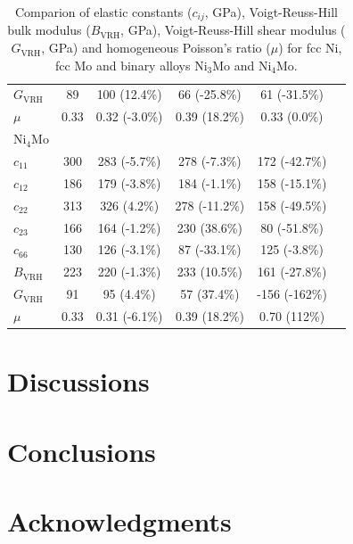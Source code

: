 \documentclass[prb,reprint]{revtex4-2}
\begin{document}
\begin{table}[h]
\begin{tabular}{lccccc}
$G_{\mathrm{VRH}}$ & 89 & 100 (12.4\%) & 66 (-25.8\%) & 61 (-31.5\%) & \\
$\mu$ & 0.33 & 0.32 (-3.0\%) & 0.39 (18.2\%) & 0.33 (0.0\%) & \\
\hline
Ni$_4$Mo \\
$c_{11}$ & 300 & 283 (-5.7\%) & 278 (-7.3\%) & 172 (-42.7\%) & \\
$c_{12}$ & 186 & 179 (-3.8\%) & 184 (-1.1\%) & 158 (-15.1\%) & \\
$c_{22}$ & 313 & 326 (4.2\%) & 278 (-11.2\%) & 158 (-49.5\%) & \\
\color{blue} $c_{23}$ & 166 & 164 (-1.2\%) & 230 (38.6\%) & 80 (-51.8\%) & \\
\color{blue} $c_{66}$ & 130 & 126 (-3.1\%) & 87 (-33.1\%) & 125 (-3.8\%) & \\
$B_{\mathrm{VRH}}$ & 223 & 220 (-1.3\%) & 233 (10.5\%) & 161 (-27.8\%) & \\
$G_{\mathrm{VRH}}$ & 91 & 95 (4.4\%) & 57 (37.4\%) & -156 (-162\%) & \\
$\mu$ & 0.33 & 0.31 (-6.1\%) & 0.39 (18.2\%) & 0.70 (112\%) & \\
\hline
\end{tabular}
\caption{\label{table:NiMo_elastic_constants}
Comparion of elastic constants ($c_{ij}$, GPa), Voigt-Reuss-Hill bulk modulus 
($B_{\mathrm{VRH}}$, GPa), Voigt-Reuss-Hill shear modulus ($G_{\mathrm{VRH}}$, 
GPa) and homogeneous Poisson's ratio ($\mu$) for fcc Ni, fcc Mo and binary 
alloys Ni$_{3}$Mo and Ni$_{4}$Mo.
}
\end{table}

% 
%
\section{Discussions}
\label{sec:discussions}

% 
%
\section{Conclusions}
\label{sec:conclusions}

% 
%
\section*{Acknowledgments}
\label{sec:acknowledgments}

% 
%

\end{document}

